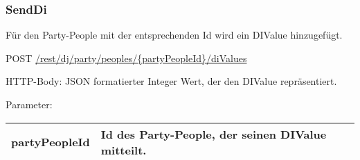 \subsubsection{SendDi}
\label{service:SendDi}
Für den Party-People mit der entsprechenden Id wird ein DIValue hinzugefügt.

POST
\url{/rest/dj/party/peoples/{partyPeopleId}/diValues}

HTTP-Body: JSON formatierter Integer Wert, der den DIValue repräsentiert.

Parameter:\\
\begin{tabularx}{\textwidth}{|l|X|}
\hline partyPeopleId & Id des Party-People, der seinen DIValue mitteilt. \\ 
\hline 
\end{tabularx}